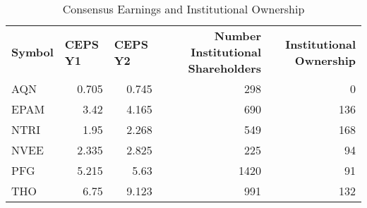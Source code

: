 \documentclass{article}
\begin{document}
\begin{table}[htbp]
  \caption{Consensus Earnings and Institutional Ownership}
    \begin{tabular}{lrrrr}
    	\textbf{Symbol} & \multicolumn{1}{l}{\textbf{CEPS Y1}} & \multicolumn{1}{l}{\textbf{CEPS Y2}} & \multicolumn{1}{p{4.215em}}{\textbf{Number Institutional Shareholders}} & \multicolumn{1}{p{4.215em}}{\textbf{Institutional Ownership}} \\
    	AQN   & 0.705 & 0.745 & 298   & 0 \\
    	EPAM  & 3.42  & 4.165 & 690   & 136 \\
    	NTRI  & 1.95  & 2.268 & 549   & 168 \\
    	NVEE  & 2.335 & 2.825 & 225   & 94 \\
    	PFG   & 5.215 & 5.63  & 1420  & 91 \\
    	THO   & 6.75  & 9.123 & 991   & 132 \\
    \end{tabular}%
    \label{tab:addlabel}%
\end{table}%
\end{document}
